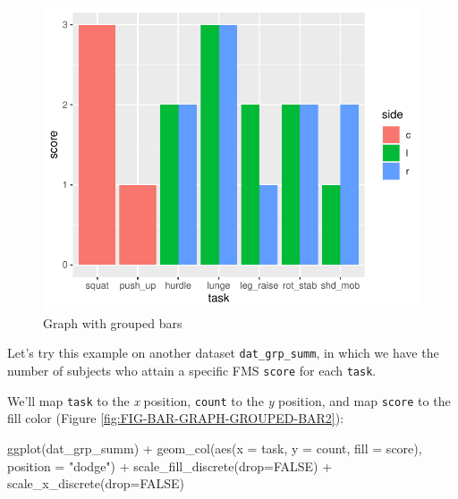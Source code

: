 \documentclass[
]{book}
\newenvironment{Shaded}{\begin{snugshade}}{\end{snugshade}}
\newcommand{\AttributeTok}[1]{\textcolor[rgb]{0.77,0.63,0.00}{#1}}
\newcommand{\ConstantTok}[1]{\textcolor[rgb]{0.00,0.00,0.00}{#1}}
\newcommand{\FunctionTok}[1]{\textcolor[rgb]{0.00,0.00,0.00}{#1}}
\newcommand{\NormalTok}[1]{#1}
\newcommand{\SpecialCharTok}[1]{\textcolor[rgb]{0.00,0.00,0.00}{#1}}
\newcommand{\StringTok}[1]{\textcolor[rgb]{0.31,0.60,0.02}{#1}}
\begin{document}
\begin{figure}

{\centering \includegraphics{se201_stats_book_files/figure-latex/FIG-BAR-GRAPH-GROUPED-BAR-1} 

}

\caption[Graph with grouped bars]{Graph with grouped bars}\label{fig:FIG-BAR-GRAPH-GROUPED-BAR}
\end{figure}

Let's try this example on another dataset \texttt{dat\_grp\_summ}, in which we have the number of subjects who attain a specific FMS \texttt{score} for each \texttt{task}.

We'll map \texttt{task} to the \emph{x} position, \texttt{count} to the \emph{y} position, and map \texttt{score} to the fill color (Figure \ref{fig:FIG-BAR-GRAPH-GROUPED-BAR2}):

\begin{Shaded}
\begin{Highlighting}[]
\FunctionTok{ggplot}\NormalTok{(dat\_grp\_summ) }\SpecialCharTok{+}
  \FunctionTok{geom\_col}\NormalTok{(}\FunctionTok{aes}\NormalTok{(}\AttributeTok{x =}\NormalTok{ task, }\AttributeTok{y =}\NormalTok{ count, }\AttributeTok{fill =}\NormalTok{ score), }\AttributeTok{position =} \StringTok{"dodge"}\NormalTok{) }\SpecialCharTok{+}
  \FunctionTok{scale\_fill\_discrete}\NormalTok{(}\AttributeTok{drop=}\ConstantTok{FALSE}\NormalTok{) }\SpecialCharTok{+}
  \FunctionTok{scale\_x\_discrete}\NormalTok{(}\AttributeTok{drop=}\ConstantTok{FALSE}\NormalTok{)}
\end{Highlighting}
\end{Shaded}
\end{document}
